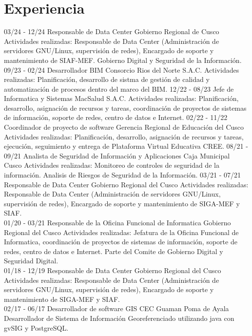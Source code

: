 \documentclass[]{friggeri-cv}
\begin{document}
\section{Experiencia}
\begin{entrylist}
    \entry
    {03/24 - 12/24}
    {Responsable de Data Center}
    {Gobierno Regional de Cusco}
    {Actividades realizadas: Responsable de Data Center (Administraci\'on de servidores GNU/Linux, supervisi\'on
    de redes), Encargado de soporte y mantenimiento de SIAF-MEF. Gobierno Digital y Seguridad de la Información.}
    \entry
    {09/23 - 02/24}
    {Desarrollador BIM}
    {Consorcio Rios del Norte S.A.C.}
    {Actividades realizadas: Planificación, desarrollo de sistma de gestión de calidad y automatización de procesos dentro 
    del marco del BIM.}
    \entry
    {12/22 - 08/23}
    {Jefe de Informatica y Sistemas}
    {MacSalud S.A.C.}
    {Actividades realizadas: Planificación, desarrollo, asignación de recursos y tareas, coordinación de proyectos de 
     sistemas de información, soporte de redes, centro de datos e Internet.}
    \entry
    {02/22 - 11/22}
    {Coordinador de proyecto de software}
    {Gerencia Regional de Educación del Cusco}
    {Actividades realizadas: Planificación, desarrollo, asignación de recursos y tareas,
     ejecución, seguimiento y entrega de Plataforma Virtual Educativa CREE.}
    \entry
    {08/21 - 09/21}
    {Analista de Seguridad de Información y Aplicaciones}
    {Caja Municipal Cusco}
    {Actividades realizadas: Monitoreo de controles de seguridad de la información. Analisis de Riesgos de Seguridad
    de la Información.}
    \entry
    {03/21 - 07/21}
    {Responsable de Data Center}
    {Gobierno Regional del Cusco}
    {Actividades realizadas: Responsable de Data Center (Administraci\'on de servidores GNU/Linux, supervisi\'on
    de redes), Encargado de soporte y mantenimiento de SIGA-MEF y SIAF.\\}
    \entry
    {01/20 - 03/21}
    {Responsable de la Oficina Funcional de Informatica}
    {Gobierno Regional del Cusco}
    {Actividades realizadas: Jefatura de la Oficina Funcional de Informatica, coordinación de proyectos de sistemas de información,
     soporte de redes, centro de datos e Internet. Parte del Comite de Gobierno Digital y Seguridad Digital.\\}
    \entry
    {01/18 - 12/19}
    {Responsable de Data Center}
    {Gobierno Regional del Cusco}
    {Actividades realizadas: Responsable de Data Center (Administraci\'on de servidores GNU/Linux, supervisi\'on
    de redes), Encargado de soporte y mantenimiento de SIGA-MEF y SIAF.\\}
    \entry
    {02/17 - 06/17}
    {Desarrollador de software GIS}
    {CEC Guaman Poma de Ayala}
    {Desarrollador de Sistema de Informaci\'on Georeferenciado utilizando java con gvSIG y PostgreSQL.\\}
\end{entrylist}
\end{document}
